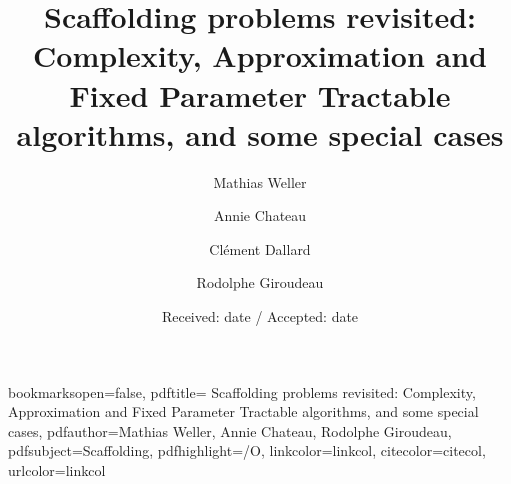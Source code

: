 \newcommand{\papertitle}{%
Scaffolding problems revisited: Complexity, Approximation and Fixed Parameter Tractable algorithms, and some special cases}
\newcommand{\paperauthors}{Mathias Weller \and Annie Chateau \and Cl\'ement Dallard \and Rodolphe Giroudeau}
\newcommand{\papersubject}{Scaffolding}


\hypersetup
{
bookmarksopen=false,
pdftitle=\papertitle,
pdfauthor={Mathias Weller, Annie Chateau, Rodolphe Giroudeau}, 
pdfsubject=\papersubject,
pdfhighlight=/O, 
linkcolor=linkcol,
citecolor=citecol, 
urlcolor=linkcol 
}


\pagestyle{plain}

\title{\papertitle}

\author{Mathias Weller \and Annie Chateau \and Cl\'ement Dallard \and Rodolphe Giroudeau}


\date{Received: date / Accepted: date}



